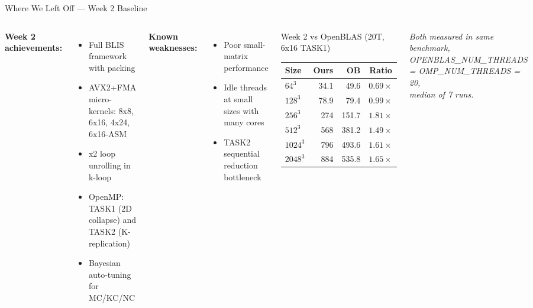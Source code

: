 \documentclass[aspectratio=169]{beamer}
\begin{document}
\begin{frame}{Where We Left Off --- Week 2 Baseline}
  \begin{columns}
    \textbf{Week 2 achievements:}
    \begin{itemize}
      \item Full BLIS framework with packing
      \item AVX2+FMA micro-kernels: 8x8, 6x16, 4x24, 6x16-ASM
      \item x2 loop unrolling in k-loop
      \item OpenMP: TASK1 (2D collapse) and TASK2 (K-replication)
      \item Bayesian auto-tuning for MC/KC/NC
    \end{itemize}
    \vspace{0.2cm}
    \textbf{Known weaknesses:}
    \begin{itemize}
      \item Poor small-matrix performance
      \item Idle threads at small sizes with many cores
      \item TASK2 sequential reduction bottleneck
    \end{itemize}

    \begin{block}{Week 2 vs OpenBLAS (20T, 6x16 TASK1)}
      \footnotesize
      \begin{tabular}{lrrc}
        \toprule
        Size & Ours & OB & Ratio \\
        \midrule
        $64^3$   & 34.1 & 49.6 & $0.69\times$ \\
        $128^3$  & 78.9 & 79.4 & $0.99\times$ \\
        $256^3$  & 274  & 151.7 & \textcolor{good}{$1.81\times$} \\
        $512^3$  & 568  & 381.2 & \textcolor{good}{$1.49\times$} \\
        $1024^3$ & 796  & 493.6 & \textcolor{good}{$1.61\times$} \\
        $2048^3$ & 884  & 535.8 & \textcolor{good}{$1.65\times$} \\
        \bottomrule
      \end{tabular}
    \end{block}
    \vspace{0.1cm}
    \scriptsize
    \textit{Both measured in same benchmark,\\OPENBLAS\_NUM\_THREADS = OMP\_NUM\_THREADS = 20,\\median of 7 runs.}
  \end{columns}
\end{frame}
\end{document}
